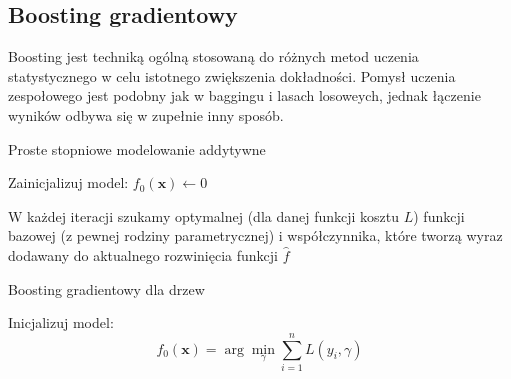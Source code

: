 \documentclass{myclass}
\begin{document}
\subsection{Boosting gradientowy}

Boosting jest techniką ogólną stosowaną do różnych metod uczenia statystycznego w celu istotnego
zwiększenia dokładności. Pomysł uczenia zespołowego jest podobny jak w baggingu i lasach losoweych,
jednak łączenie wyników odbywa się w zupełnie inny sposób.

\begin{algorithm}[ht]
\caption{Proste stopniowe modelowanie addytywne}

Zainicjalizuj model: $f_0(\bm{x}) \leftarrow 0$\;

\end{algorithm}
W każdej iteracji szukamy optymalnej (dla danej funkcji kosztu $L$) funkcji bazowej (z pewnej rodziny parametrycznej) i
współczynnika, które tworzą wyraz dodawany do aktualnego rozwinięcia funkcji $\hat{f}$

\begin{algorithm}[ht]
\caption{Boosting gradientowy dla drzew}

Inicjalizuj model:
\[
f_0(\bm{x}) =\arg\min_{\gamma} \sum_{i=1}^n L(y_i, \gamma)
\]


\end{algorithm}
\end{document}
